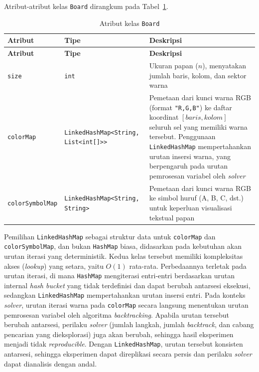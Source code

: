 Atribut-atribut kelas \texttt{Board} dirangkum pada Tabel~\ref{tab:attr-board}.

\begin{longtable}{llp{6.5cm}}
	\caption{Atribut kelas \texttt{Board}}
	\label{tab:attr-board} \\
	\toprule
	\textbf{Atribut} & \textbf{Tipe} & \textbf{Deskripsi} \\
	\midrule
	\endfirsthead
	\toprule
	\textbf{Atribut} & \textbf{Tipe} & \textbf{Deskripsi} \\
	\midrule
	\endhead
	\bottomrule
	\endfoot
	\texttt{size} & \texttt{int} & Ukuran papan ($n$), menyatakan jumlah baris, kolom, dan sektor warna \\
	\midrule
	\texttt{colorMap} & \texttt{LinkedHashMap<String, List<int[]>{}>} & Pemetaan dari kunci warna RGB (format \texttt{"R,G,B"}) ke daftar koordinat $[\textit{baris}, \textit{kolom}]$ seluruh sel yang memiliki warna tersebut. Penggunaan \texttt{LinkedHashMap} mempertahankan urutan insersi warna, yang berpengaruh pada urutan pemrosesan variabel oleh \textit{solver} \\
	\midrule
	\texttt{colorSymbolMap} & \texttt{LinkedHashMap<String, String>} & Pemetaan dari kunci warna RGB ke simbol huruf (A, B, C, dst.) untuk keperluan visualisasi tekstual papan \\
	\bottomrule
\end{longtable}

Pemilihan \texttt{LinkedHashMap} sebagai struktur data untuk \texttt{colorMap} dan \texttt{colorSymbolMap}, dan bukan \texttt{HashMap} biasa, didasarkan pada kebutuhan akan urutan iterasi yang deterministik. Kedua kelas tersebut memiliki kompleksitas akses (\textit{lookup}) yang setara, yaitu $O(1)$ rata-rata. Perbedaannya terletak pada urutan iterasi, di mana \texttt{HashMap} mengiterasi entri-entri berdasarkan urutan internal \textit{hash bucket} yang tidak terdefinisi dan dapat berubah antarsesi eksekusi, sedangkan \texttt{LinkedHashMap} mempertahankan urutan insersi entri. Pada konteks \textit{solver}, urutan iterasi warna pada \texttt{colorMap} secara langsung menentukan urutan pemrosesan variabel oleh algoritma \textit{backtracking}. Apabila urutan tersebut berubah antarsesi, perilaku \textit{solver} (jumlah langkah, jumlah \textit{backtrack}, dan cabang pencarian yang dieksplorasi) juga akan berubah, sehingga hasil eksperimen menjadi tidak \textit{reproducible}. Dengan \texttt{LinkedHashMap}, urutan tersebut konsisten antarsesi, sehingga eksperimen dapat direplikasi secara persis dan perilaku \textit{solver} dapat dianalisis dengan andal.

